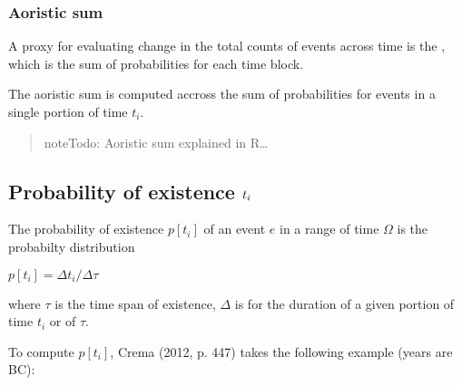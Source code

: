 \documentclass[a4paper,12pt,english]{sphinxhowto}
\begin{document}
\subsubsection{Aoristic sum}
\label{\detokenize{Uncertainty:aoristic-sum}}
A proxy for evaluating change in the total counts of events across time is the , which is the sum of probabilities for each time block.

The aoristic sum is computed accross the sum of probabilities for events in a single portion of time \(t_i\).
\begin{quote}

\begin{sphinxVerbatim}[commandchars=\\\{\},formatcom=\footnotesize]
        
           
          
          
          
           
\end{sphinxVerbatim}

\begin{sphinxadmonition}{note}{\label{\detokenize{Uncertainty:id2}}Todo:}
Aoristic sum explained in R…
\end{sphinxadmonition}
\end{quote}



\subsection{Probability of existence \protect\(t_i\protect\)}
\label{\detokenize{Uncertainty:probability-of-existence-t-i}}
The probability of existence \(p[t_i]\) of an event \(e\) in a range of time \(\varOmega\) is the probabilty distribution

\(p[t_i] = \Delta t_i / \Delta \tau\)

where \(\tau\) is the time span of existence, \(\Delta\) is for the duration of a given portion of time \(t_i\) or of \(\tau\).

To compute \(p[t_i]\), Crema (2012, p. 447) takes the following example (years are BC):
\begin{quote}

\begin{sphinxVerbatim}[commandchars=\\\{\},formatcom=\footnotesize]
    
            

       
\end{sphinxVerbatim}
\end{quote}
\end{document}
